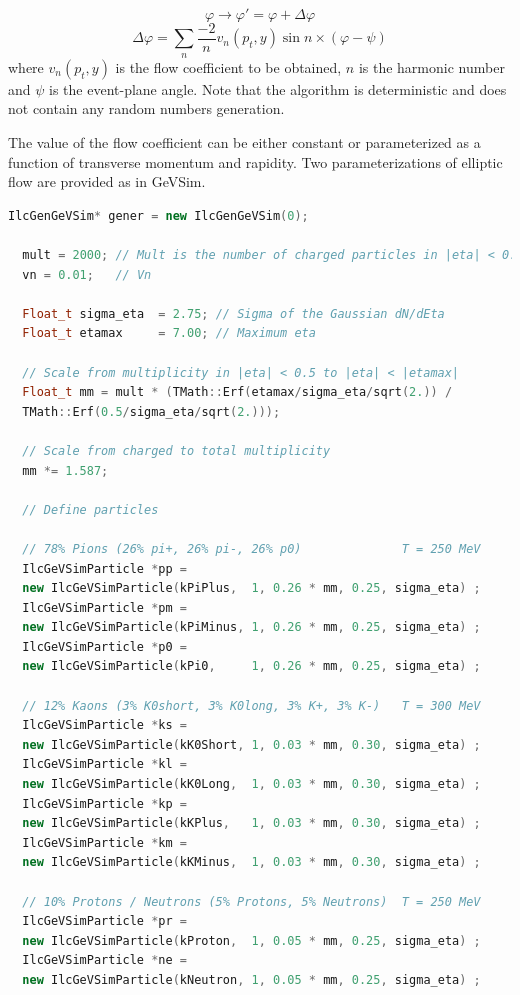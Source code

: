 \documentclass[12pt,a4paper,twoside]{article}
\begin{document}
\[
\varphi \rightarrow \varphi '=\varphi +\Delta \varphi \]
\[
\Delta \varphi =\sum _{n}\frac{-2}{n}v_{n}\left( p_{t},y\right)
\sin  n \times \left( \varphi -\psi \right) \] where \(
v_{n}(p_{t},y) \) is the flow coefficient to be obtained, \( n \)
is the harmonic number and \( \psi \) is the event-plane angle.
Note that the algorithm is deterministic and does not contain any
random numbers generation.

The value of the flow coefficient can be either constant or parameterized as a
function of transverse momentum and rapidity.  Two parameterizations
of elliptic flow are provided as in GeVSim.

\begin{lstlisting}[language=C++]
  IlcGenGeVSim* gener = new IlcGenGeVSim(0);

  mult = 2000; // Mult is the number of charged particles in |eta| < 0.5
  vn = 0.01;   // Vn

  Float_t sigma_eta  = 2.75; // Sigma of the Gaussian dN/dEta
  Float_t etamax     = 7.00; // Maximum eta

  // Scale from multiplicity in |eta| < 0.5 to |eta| < |etamax|	
  Float_t mm = mult * (TMath::Erf(etamax/sigma_eta/sqrt(2.)) /
  TMath::Erf(0.5/sigma_eta/sqrt(2.))); 

  // Scale from charged to total multiplicity
  mm *= 1.587;

  // Define particles

  // 78% Pions (26% pi+, 26% pi-, 26% p0)              T = 250 MeV
  IlcGeVSimParticle *pp =  
  new IlcGeVSimParticle(kPiPlus,  1, 0.26 * mm, 0.25, sigma_eta) ;
  IlcGeVSimParticle *pm =  
  new IlcGeVSimParticle(kPiMinus, 1, 0.26 * mm, 0.25, sigma_eta) ;
  IlcGeVSimParticle *p0 =  
  new IlcGeVSimParticle(kPi0,     1, 0.26 * mm, 0.25, sigma_eta) ;

  // 12% Kaons (3% K0short, 3% K0long, 3% K+, 3% K-)   T = 300 MeV
  IlcGeVSimParticle *ks =  
  new IlcGeVSimParticle(kK0Short, 1, 0.03 * mm, 0.30, sigma_eta) ;
  IlcGeVSimParticle *kl =
  new IlcGeVSimParticle(kK0Long,  1, 0.03 * mm, 0.30, sigma_eta) ;
  IlcGeVSimParticle *kp =
  new IlcGeVSimParticle(kKPlus,   1, 0.03 * mm, 0.30, sigma_eta) ;
  IlcGeVSimParticle *km =
  new IlcGeVSimParticle(kKMinus,  1, 0.03 * mm, 0.30, sigma_eta) ;

  // 10% Protons / Neutrons (5% Protons, 5% Neutrons)  T = 250 MeV
  IlcGeVSimParticle *pr =
  new IlcGeVSimParticle(kProton,  1, 0.05 * mm, 0.25, sigma_eta) ;
  IlcGeVSimParticle *ne =
  new IlcGeVSimParticle(kNeutron, 1, 0.05 * mm, 0.25, sigma_eta) ;


\end{lstlisting}
\end{document}

